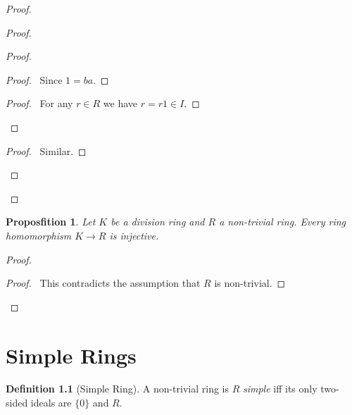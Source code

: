 \documentclass{book}
\let\qed\relax
\newtheorem{prop}{Proposfition}[chapter]
\theoremstyle{definition}
\newtheorem{df}[prop]{Definition}
\newcommand{\inv}[1]{\ensuremath{{#1}^{-1}}}
\begin{document}
\begin{proof}
\pf
{}
\begin{proof}
	\begin{proof}
		\begin{proof}
			\pf\ Since $1 = ba$.
		\end{proof}
		\begin{proof}
			\pf\ For any $r \in R$ we have $r = r1 \in I$.
		\end{proof}
	\end{proof}
	\begin{proof}
		\pf\ Similar.
	\end{proof}
\end{proof}
\qed
\end{proof}

\begin{prop}
Let $K$ be a division ring and $R$ a non-trivial ring. Every ring homomorphism $K \rightarrow R$ is injective.
\end{prop}

\begin{proof}
\pf
{}
\step{4}{$\phi(x \inv{x}) = 1$}
\qedstep
\begin{proof}
\pf\ This contradicts the assumption that $R$ is non-trivial.
\end{proof}
\qed
\end{proof}

\chapter{Simple Rings}

\begin{df}[Simple Ring]
A non-trivial ring is $R$ \emph{simple} iff its only two-sided ideals are $\{0\}$ and $R$.
\end{df}
\end{document}
